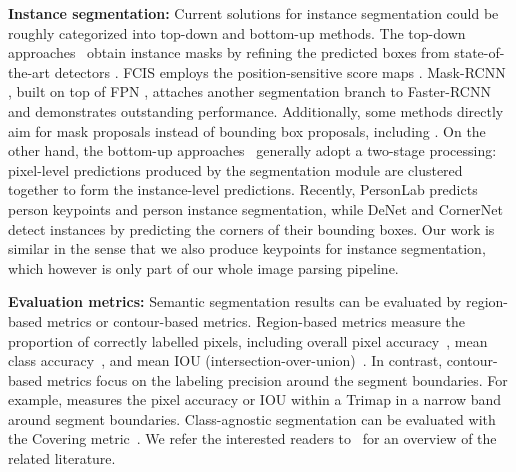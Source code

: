 \documentclass[10pt,twocolumn,letterpaper]{article}
\begin{document}
{\bf Instance segmentation:} Current solutions for instance segmentation could be roughly categorized into top-down and bottom-up methods. The top-down approaches~\cite{dai2016instance,dai2017fully,dai2017deformable,he2017mask,chen2018masklab,liu2018path,peng2018megdet} obtain instance masks by refining the predicted boxes from state-of-the-art detectors \cite{ren2015faster,dai2016rfcn,cai2018cascade}. FCIS \cite{dai2017fully} employs the position-sensitive score maps \cite{dai2016instancesensitive}. Mask-RCNN \cite{he2017mask}, built on top of FPN \cite{lin2016feature}, attaches another segmentation branch to Faster-RCNN \cite{ren2015faster} and demonstrates outstanding performance. Additionally, some methods directly aim for mask proposals instead of bounding box proposals, including \cite{carreira2012cpmc,arbelaez2014multiscale,pinheiro2015learning,pinheiro2016learning,dai2016instancesensitive}. On the other hand, the bottom-up approaches~\cite{liang2015proposal,zhang2015monocular,uhrig2016pixel,zhang2016instance,bai2017deep,liu2017sgn,kirillov2017instancecut,newell2017associative,fathi2017semantic,de2017semantic,kendall2018multi,liu2018affinity} generally adopt a two-stage processing: pixel-level predictions produced by the segmentation module are clustered together to form the instance-level predictions. Recently, PersonLab \cite{papandreou2018personlab} predicts person keypoints and person instance segmentation, while DeNet \cite{tychsen2017denet} and CornerNet \cite{law2018cornernet} detect instances by predicting the corners of their bounding boxes. Our work is similar in the sense that we also produce keypoints for instance segmentation, which however is only part of our whole image parsing pipeline.

{\bf Evaluation metrics:} Semantic segmentation results can be evaluated by region-based metrics or contour-based metrics. Region-based metrics measure the proportion of correctly labelled pixels, including overall pixel accuracy~\cite{he2004multiscale,shotton2009textonboost}, mean class accuracy~\cite{shotton2009textonboost}, and mean IOU (intersection-over-union)~\cite{everingham2014pascal}. In contrast, contour-based metrics focus on the labeling precision around the segment boundaries. For example, \cite{kohli2009robust} measures the pixel accuracy or IOU within a Trimap in a narrow band around segment boundaries. Class-agnostic segmentation can be evaluated with the Covering metric~\cite{amfm_pami2011}. We refer the interested readers to~\cite{amfm_pami2011,csurka2013good} for an overview of the related literature.
\end{document}
